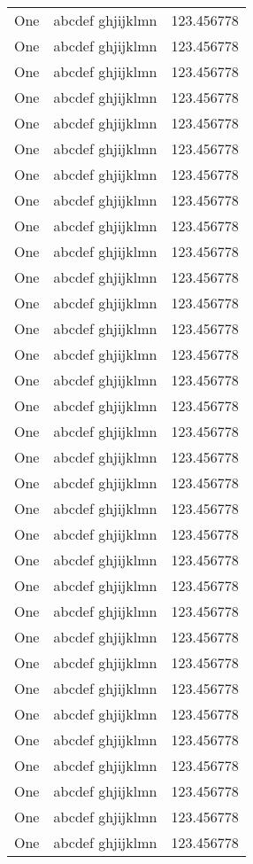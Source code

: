 \begin{ThreePartTable}
\begin{xltabular}{\textwidth}{XXX}
One & abcdef ghjijklmn & 123.456778 \\
One & abcdef ghjijklmn & 123.456778 \\
One & abcdef ghjijklmn & 123.456778 \\
One & abcdef ghjijklmn & 123.456778 \\
One & abcdef ghjijklmn & 123.456778 \\
One & abcdef ghjijklmn & 123.456778 \\
One & abcdef ghjijklmn & 123.456778 \\
One & abcdef ghjijklmn & 123.456778 \\
One & abcdef ghjijklmn & 123.456778 \\
One & abcdef ghjijklmn & 123.456778 \\
One & abcdef ghjijklmn & 123.456778 \\
One & abcdef ghjijklmn & 123.456778 \\
One & abcdef ghjijklmn & 123.456778 \\
One & abcdef ghjijklmn & 123.456778 \\
One & abcdef ghjijklmn & 123.456778 \\
One & abcdef ghjijklmn & 123.456778 \\
One & abcdef ghjijklmn & 123.456778 \\
One & abcdef ghjijklmn & 123.456778 \\
One & abcdef ghjijklmn & 123.456778 \\
One & abcdef ghjijklmn & 123.456778 \\
One & abcdef ghjijklmn & 123.456778 \\
One & abcdef ghjijklmn & 123.456778 \\
One & abcdef ghjijklmn & 123.456778 \\
One & abcdef ghjijklmn & 123.456778 \\
One & abcdef ghjijklmn & 123.456778 \\
One & abcdef ghjijklmn & 123.456778 \\
One & abcdef ghjijklmn & 123.456778 \\
One & abcdef ghjijklmn & 123.456778 \\
One & abcdef ghjijklmn & 123.456778 \\
One & abcdef ghjijklmn & 123.456778 \\
One & abcdef ghjijklmn & 123.456778 \\
One & abcdef ghjijklmn & 123.456778 \\
One & abcdef ghjijklmn & 123.456778 \\

\end{xltabular}
\end{ThreePartTable}
